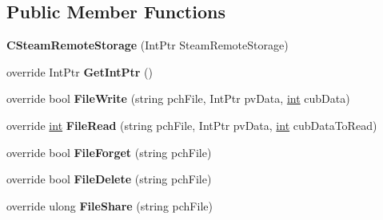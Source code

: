 \subsection*{Public Member Functions}
\begin{DoxyCompactItemize}
\item 
\hypertarget{classValve_1_1Steamworks_1_1CSteamRemoteStorage_a1bdc31f5d3458f710456bd99de9354f4}{}{\bfseries C\+Steam\+Remote\+Storage} (Int\+Ptr Steam\+Remote\+Storage)\label{classValve_1_1Steamworks_1_1CSteamRemoteStorage_a1bdc31f5d3458f710456bd99de9354f4}

\item 
\hypertarget{classValve_1_1Steamworks_1_1CSteamRemoteStorage_aca3d3b2c6d98c0e1c25661fed0926092}{}override Int\+Ptr {\bfseries Get\+Int\+Ptr} ()\label{classValve_1_1Steamworks_1_1CSteamRemoteStorage_aca3d3b2c6d98c0e1c25661fed0926092}

\item 
\hypertarget{classValve_1_1Steamworks_1_1CSteamRemoteStorage_a35adc025fcb23c28b02946aa4c7c23f2}{}override bool {\bfseries File\+Write} (string pch\+File, Int\+Ptr pv\+Data, \hyperlink{SDL__thread_8h_a6a64f9be4433e4de6e2f2f548cf3c08e}{int} cub\+Data)\label{classValve_1_1Steamworks_1_1CSteamRemoteStorage_a35adc025fcb23c28b02946aa4c7c23f2}

\item 
\hypertarget{classValve_1_1Steamworks_1_1CSteamRemoteStorage_a652e2419f03686be8c91116615ec960d}{}override \hyperlink{SDL__thread_8h_a6a64f9be4433e4de6e2f2f548cf3c08e}{int} {\bfseries File\+Read} (string pch\+File, Int\+Ptr pv\+Data, \hyperlink{SDL__thread_8h_a6a64f9be4433e4de6e2f2f548cf3c08e}{int} cub\+Data\+To\+Read)\label{classValve_1_1Steamworks_1_1CSteamRemoteStorage_a652e2419f03686be8c91116615ec960d}

\item 
\hypertarget{classValve_1_1Steamworks_1_1CSteamRemoteStorage_a3c96340acd28a4e2e4067107cf7dab0f}{}override bool {\bfseries File\+Forget} (string pch\+File)\label{classValve_1_1Steamworks_1_1CSteamRemoteStorage_a3c96340acd28a4e2e4067107cf7dab0f}

\item 
\hypertarget{classValve_1_1Steamworks_1_1CSteamRemoteStorage_af0bba429ef6af586e2ce3f60b5fef85c}{}override bool {\bfseries File\+Delete} (string pch\+File)\label{classValve_1_1Steamworks_1_1CSteamRemoteStorage_af0bba429ef6af586e2ce3f60b5fef85c}

\item 
\hypertarget{classValve_1_1Steamworks_1_1CSteamRemoteStorage_ad3e0aa4ed42a2c12795f9da0872be364}{}override ulong {\bfseries File\+Share} (string pch\+File)\label{classValve_1_1Steamworks_1_1CSteamRemoteStorage_ad3e0aa4ed42a2c12795f9da0872be364}


\end{DoxyCompactItemize}
